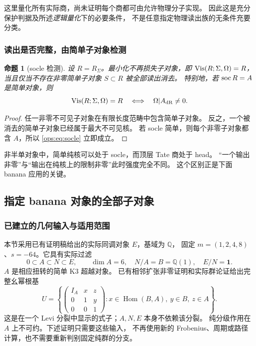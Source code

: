 \documentclass[11pt,a4paper,oneside]{ctexart}
\theoremstyle{cnplain}
\newtheorem{proposition}[theorem]{命题}
\theoremstyle{definition}
\theoremstyle{remark}
\newcommand{\Q}{\mathbb Q}
\newcommand{\Hom}{\operatorname{Hom}}
\newcommand{\dR}{\mathrm{dR}}
\numberwithin{equation}{section}
\begin{document}
这里量化所有实际商，尚未证明每个商都可由允许物理分子实现。
因此这是充分保护判据及所述\emph{逻辑量化}下的必要条件，
不是任意指定物理读出族的无条件充要分类。

\subsubsection{读出是否完整，由简单子对象检测}
\begin{proposition}[socle 检测]\label{ops:prop:socle}
设 $R=R_\Sigma$。最小化不再损失子对象，即
$\operatorname{Vis}(R;\Sigma,\Omega)=R$，当且仅当不存在非零简单子对象
$S\subset R$ 被全部读出消去。
特别地，若 $\operatorname{soc} R=A$ 是简单对象，则
\begin{equation}\label{ops:eq:socle}
 \Vis(R;\Sigma,\Omega)=R
 \quad\Longleftrightarrow\quad \Omega|A_{\dR}\ne0.
\end{equation}
\end{proposition}
\begin{proof}
任一非零不可见子对象在有限长度范畴中包含简单子对象。
反之，一个被消去的简单子对象已经属于最大不可见核。
若 socle 简单，则每个非零子对象都含 $A$，所以 \eqref{ops:eq:socle} 立即成立。
\end{proof}

非半单对象中，简单纯核可以处于 socle，而顶层 Tate 商处于 head。
``一个输出非零''与``输出在纯核上的限制非零''此时强度完全不同。
这个区别正是下面 banana 应用的关键。


\subsection{指定 banana 对象的全部子对象}
\subsubsection{已建立的几何输入与适用范围}
本节采用已有证明稿给出的实际同调对象 $E$，基域为 $\Q$，
固定 $m=(1,2,4,8)$、$s=-64$。它具有实际过滤
\begin{equation}\label{ops:eq:banana}
 0\subset A\subset N\subset E,
 \qquad \dim A=6,\quad N/A=B=\Q(1),\quad E/N=\mathbf1.
\end{equation}
$A$ 是相应扭转的简单 K3 超越对象。
已有相邻扩张非零证明和实际群论证给出完整幺幂根基
\begin{equation}\label{ops:eq:U}
 U=\left\{
 \begin{pmatrix}I_A&x&z\\0&1&y\\0&0&1\end{pmatrix}
 :x\in\Hom(B,A),\ y\in B,\ z\in A\right\}.
\end{equation}
这是在一个 Levi 分裂中显示的式子；$A,N,E$ 本身不依赖该分裂。
纯分级作用在 $A$ 上不可约。下述证明只需要这些输入，
不再使用新的 Frobenius、周期或路径计算，也不需要重新判别固定纯群的分支。
\end{document}
